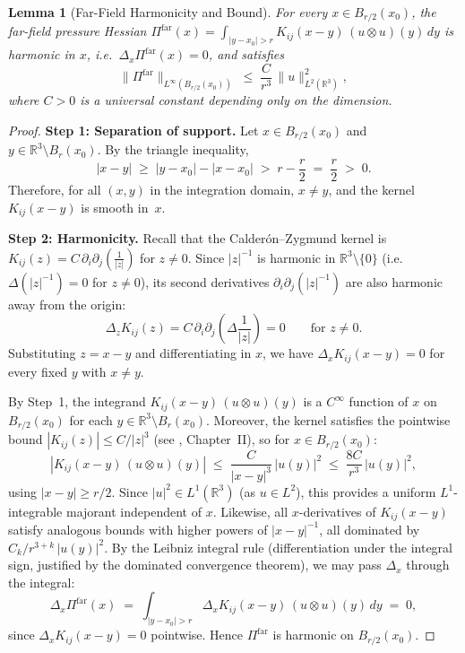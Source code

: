 \documentclass[11pt]{article}
\newtheorem{lemma}{Lemma}
\theoremstyle{definition}
\begin{document}
\begin{lemma}[Far-Field Harmonicity and Bound]
\label{lem:far-field}
For every $x \in B_{r/2}(x_0)$, the far-field pressure Hessian
$\Pi^{\mathrm{far}}(x) = \int_{|y-x_0|>r} K_{ij}(x-y)\,(u\otimes u)(y)\,dy$
is harmonic in $x$, i.e.\ $\Delta_x \Pi^{\mathrm{far}}(x) = 0$, and satisfies
\[
  \|\Pi^{\mathrm{far}}\|_{L^\infty(B_{r/2}(x_0))}
  \;\leq\;
  \frac{C}{r^3}\,\|u\|_{L^2(\mathbb{R}^3)}^2,
\]
where $C > 0$ is a universal constant depending only on the dimension.
\end{lemma}

\begin{proof}
\textbf{Step 1: Separation of support.}
Let $x \in B_{r/2}(x_0)$ and $y \in \mathbb{R}^3 \setminus B_r(x_0)$.  By the triangle inequality,
\[
  |x - y|
  \;\geq\;
  |y - x_0| - |x - x_0|
  \;>\;
  r - \frac{r}{2}
  \;=\;
  \frac{r}{2}
  \;>\; 0.
\]
Therefore, for all $(x,y)$ in the integration domain, $x \neq y$, and the kernel $K_{ij}(x-y)$ is smooth in~$x$.

\textbf{Step 2: Harmonicity.}
Recall that the Calder\'on--Zygmund kernel is
$K_{ij}(z) = C\,\partial_i \partial_j\!\left(\frac{1}{|z|}\right)$
for $z \neq 0$.
Since $|z|^{-1}$ is harmonic in $\mathbb{R}^3 \setminus \{0\}$ (i.e.\ $\Delta(|z|^{-1}) = 0$ for $z \neq 0$),
its second derivatives $\partial_i \partial_j(|z|^{-1})$ are also harmonic away from the origin:
\[
  \Delta_z K_{ij}(z) = C\,\partial_i\partial_j\!\left(\Delta \frac{1}{|z|}\right) = 0
  \qquad \text{for } z \neq 0.
\]
Substituting $z = x - y$ and differentiating in $x$, we have
$\Delta_x K_{ij}(x - y) = 0$ for every fixed $y$ with $x \neq y$.

By Step~1, the integrand $K_{ij}(x-y)\,(u\otimes u)(y)$ is a $C^\infty$ function of $x$ on $B_{r/2}(x_0)$ for each $y \in \mathbb{R}^3 \setminus B_r(x_0)$.  Moreover, the kernel satisfies the pointwise bound $|K_{ij}(z)| \leq C/|z|^3$ (see \cite{Stein}, Chapter~II), so for $x \in B_{r/2}(x_0)$:
\[
  |K_{ij}(x-y)\,(u\otimes u)(y)|
  \;\leq\;
  \frac{C}{|x-y|^3}\,|u(y)|^2
  \;\leq\;
  \frac{8C}{r^3}\,|u(y)|^2,
\]
using $|x - y| \geq r/2$.  Since $|u|^2 \in L^1(\mathbb{R}^3)$ (as $u \in L^2$), this provides a uniform $L^1$-integrable majorant independent of $x$.  Likewise, all $x$-derivatives of $K_{ij}(x-y)$ satisfy analogous bounds with higher powers of $|x-y|^{-1}$, all dominated by $C_k/r^{3+k}\,|u(y)|^2$.  By the Leibniz integral rule (differentiation under the integral sign, justified by the dominated convergence theorem), we may pass $\Delta_x$ through the integral:
\[
  \Delta_x \Pi^{\mathrm{far}}(x)
  \;=\;
  \int_{|y-x_0|>r} \Delta_x K_{ij}(x-y)\,(u\otimes u)(y)\,dy
  \;=\; 0,
\]
since $\Delta_x K_{ij}(x-y) = 0$ pointwise.  Hence $\Pi^{\mathrm{far}}$ is harmonic on $B_{r/2}(x_0)$.


\end{proof}
\end{document}
